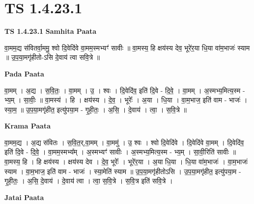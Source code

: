 \documentclass[17pt]{extarticle}
\begin{document}
\section*{ TS 1.4.23.1 }

\textbf{TS 1.4.23.1 } \newline
\textbf{Samhita Paata} \newline

वा॒मम॒द्य स॑वितर्वा॒ममु॒ श्वो दि॒वेदि॑वे वा॒मम॒स्मभ्यꣳ॑ सावीः ॥ वा॒मस्य॒ हि क्षय॑स्य देव॒ भूरे॑र॒या धि॒या वा॑म॒भाजः॑ स्याम ॥ उ॒प॒या॒मगृ॑हीतो-ऽसि दे॒वाय॑ त्वा सवि॒त्रे ॥ \newline

\textbf{Pada Paata} \newline

वा॒मम् । अ॒द्य । स॒वि॒तः॒ । वा॒मम् । उ॒ । श्वः । दि॒वेदि॑व॒ इति॑ दि॒वे - दि॒वे॒ । वा॒मम् । अ॒स्मभ्य॒मित्य॒स्म - भ्य॒म् । सा॒वीः॒ ॥ वा॒मस्य॑ । हि । क्षय॑स्य । दे॒व॒ । भूरेः᳚ । अ॒या । धि॒या । वा॒म॒भाज॒ इति॑ वाम - भाजः॑ । स्या॒म॒ ॥ उ॒प॒या॒मगृ॑हीत॒ इत्यु॑पया॒म - गृ॒ही॒तः॒ । अ॒सि॒ । दे॒वाय॑ । त्वा॒ । स॒वि॒त्रे ॥  \newline


\textbf{Krama Paata} \newline

वा॒मम॒द्य । अ॒द्य स॑वितः । स॒वि॒त॒र्,वा॒मम् । वा॒ममु॑ । उ॒ श्वः । श्वो दि॒वेदि॑वे । दि॒वेदि॑वे वा॒मम् । दि॒वेदि॑व॒ इति॑ दि॒वे - दि॒वे॒ । वा॒मम॒स्मभ्य᳚म् । अ॒स्मभ्यꣳ॑ सावीः । अ॒स्मभ्य॒मित्य॒स्म - भ्य॒म् । सा॒वी॒रिति॑ सावीः ॥ वा॒मस्य॒ हि । हि क्षय॑स्य । क्षय॑स्य देव । दे॒व॒ भूरेः᳚ । भूरे॑र॒या । अ॒या धि॒या । धि॒या वा॑म॒भाजः॑ । वा॒म॒भाजः॑ स्याम । वा॒म॒भाज॒ इति॑ वाम - भाजः॑ । स्या॒मेति॑ स्याम ॥ उ॒प॒या॒मगृ॑हीतोऽसि । उ॒प॒या॒मगृ॑हीत॒ इत्यु॑पया॒म - गृ॒ही॒तः॒ । अ॒सि॒ दे॒वाय॑ । दे॒वाय॑ त्वा । त्वा॒ स॒वि॒त्रे । स॒वि॒त्र इति॑ सवि॒त्रे । \newline

\textbf{Jatai Paata} \newline
\end{document}
